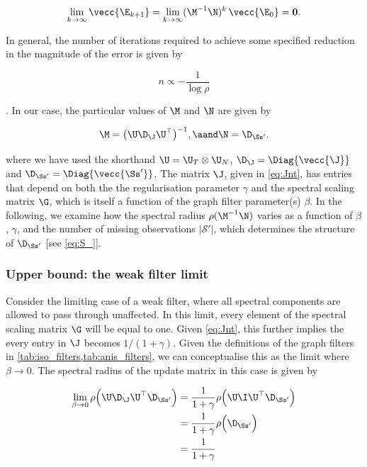 \begin{equation}
    \lim_{k \rightarrow \infty} \vecc{\E_{k+1}} = \lim_{k \rightarrow \infty} (\M^{-1} \N)^{k} \, \vecc{\E_0} = \mathbf{0} .
\end{equation}

In general, the number of iterations required to achieve some specified reduction in the magnitude of the error is given by

\begin{equation}
    \label{eq:n_SIM}
    n \propto  -\frac{1}{\log\rho}
\end{equation}


\citep{Demmel1997}. In our case, the particular values of $\M$ and $\N$ are given by

$$
\M = \big(\U \D_\J \U^\top\big)^{-1}, \aand \N = \D_{\Ss'}.
$$


where we have used the shorthand $\U = \U_T \otimes \U_N$, $\D_\J = \Diag{\vecc{\J}}$ and $\D_{\Ss'} = \Diag{\vecc{\Ss'}}$. The matrix $\J$, given in \cref{eq:Jnt}, has entries that depend on both the the regularisation parameter $\gamma$ and the spectral scaling matrix $\G$, which is itself a function of the graph filter parameter(s) $\beta$. In the following, we examine how the spectral radius $\rho(\M^{-1}\N)$ varies as a function of $\beta$, $\gamma$, and the number of missing observations $|\mathcal{S}'|$, which determines the structure of $\D_{\Ss'}$ [see \cref{eq:S_}]. 


\subsubsection{Upper bound: the weak filter limit}

Consider the limiting case of a weak filter, where all spectral components are allowed to pass through unaffected. In this limit, every element of the spectral scaling matrix $\G$ will be equal to one. Given \cref{eq:Jnt}, this further implies the every entry in $\J$ becomes $1 / (1 + \gamma)$. Given the definitions of the graph filters in \cref{tab:iso_filters,tab:anis_filters}, we can conceptualise this as the limit where $\beta \rightarrow 0$. The spectral radius of the update matrix in this case is given by


\begin{align}
    \lim_{\beta \rightarrow 0} \rho\Big(\U \D_\J \U^\top \D_{\Ss'} \Big) &= \frac{1}{1 + \gamma} \rho\Big(\U \I \U^\top \D_{\Ss'} \Big) \notag \\
    &= \frac{1}{1 + \gamma} \rho\Big(\D_{\Ss'} \Big) \notag \\
    &= \frac{1}{1 + \gamma} \label{eq:beta_lim_0} 
\end{align}

